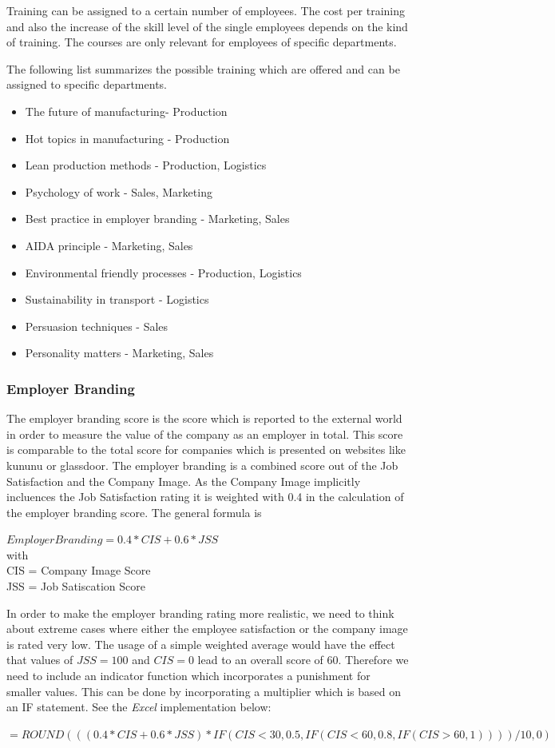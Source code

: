 Training can be assigned to a certain number of employees. The cost per training and also the increase of the skill level of the single employees depends on the kind of training. The courses are only relevant for employees of specific departments.

The following list summarizes the possible training which are offered and can be assigned to specific departments.
\begin{itemize}
\item The future of manufacturing- Production
\item Hot topics in manufacturing - Production
\item Lean production methods - Production, Logistics
\item Psychology of work - Sales, Marketing
\item Best practice in employer branding - Marketing, Sales
\item AIDA principle - Marketing, Sales
\item Environmental friendly processes - Production, Logistics
\item Sustainability in transport - Logistics
\item Persuasion techniques - Sales
\item Personality matters - Marketing, Sales
\end{itemize}

\subsubsection{Employer Branding}
The employer branding score is the score which is reported to the external world in order to measure the value of the company as an employer in total. This score is comparable to the total score for companies which is presented on websites like kununu or glassdoor. The employer branding is a combined score out of the Job Satisfaction and the Company Image. As the Company Image implicitly incluences the Job Satisfaction rating it is weighted with 0.4 in the calculation of the employer branding score. The general formula is
\begin{center}
$Employer Branding = 0.4 * CIS + 0.6 * JSS$ \\
with \\
CIS = Company Image Score   \\
JSS = Job Satiscation Score
\end{center}

In order to make the employer branding rating more realistic, we need to think about extreme cases where either the employee satisfaction or the company image is rated very low. The usage of a simple weighted average would have the effect that values of $JSS = 100$ and $CIS = 0$ lead to an overall score of 60.
Therefore we need to include an indicator function which incorporates a punishment for smaller values.
This can be done by incorporating a multiplier which is based on an IF statement. See the \textit{Excel} implementation below:
\begin{center}
    $=ROUND(((0.4*CIS+0.6*JSS)*IF(CIS<30,0.5,IF(CIS<60,0.8,IF(CIS>60,1))))/10,0)$
\end{center}

